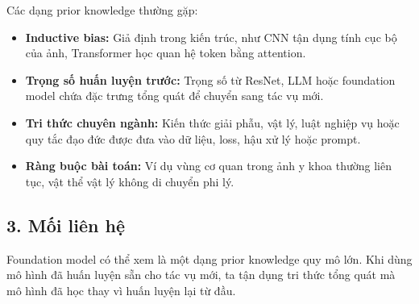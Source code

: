 Các dạng prior knowledge thường gặp:
\begin{itemize}
    \item \textbf{Inductive bias:} Giả định trong kiến trúc, như CNN tận dụng tính cục bộ của ảnh, Transformer học quan hệ token bằng attention.
    \item \textbf{Trọng số huấn luyện trước:} Trọng số từ ResNet, LLM hoặc foundation model chứa đặc trưng tổng quát để chuyển sang tác vụ mới.
    \item \textbf{Tri thức chuyên ngành:} Kiến thức giải phẫu, vật lý, luật nghiệp vụ hoặc quy tắc đạo đức được đưa vào dữ liệu, loss, hậu xử lý hoặc prompt.
    \item \textbf{Ràng buộc bài toán:} Ví dụ vùng cơ quan trong ảnh y khoa thường liên tục, vật thể vật lý không di chuyển phi lý.
\end{itemize}

\subsection*{3. Mối liên hệ}

Foundation model có thể xem là một dạng prior knowledge quy mô lớn. Khi dùng mô hình đã huấn luyện sẵn cho tác vụ mới, ta tận dụng tri thức tổng quát mà mô hình đã học thay vì huấn luyện lại từ đầu.
